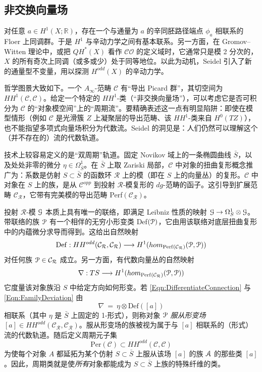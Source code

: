 \documentclass[11pt,a4paper]{article}
\numberwithin{equation}{section}
\newcommand{\bR}{\mathbb{R}}
\newcommand{\scrA}{\EuScript{A}}
\newcommand{\scrG}{\EuScript{G}}
\newcommand{\scrP}{\EuScript{P}}
\newcommand{\CC}{\mathcal{C}}
\begin{document}
\subsection{非交换向量场} 对任意 $a \in H^1(X;\bR)$，存在一个与通量为 $a$ 的辛同胚路径端点 $\phi_a$ 相联系的 Floer 上同调群。于是 $H^1$ 与辛动力学之间有基本联系。另一方面，在 Gromov--Witten 理论中，或把 $QH^*(X)$ 看作 $\mathcal{CO}$ 的定义域时，它通常只是模 2 分次的，$X$ 的所有奇次上同调（或多或少）处于同等地位。以此为动机，Seidel 引入了新的通量型不变量，用以探测 $H^{odd}(X)$ 的辛动力学。

哲学图景大致如下。一个 $A_{\infty}$-范畴 $\CC$ 有“导出 Picard 群”，其切空间为 $HH^1(\CC,\CC)$。给定一个特定的 $HH^1$-类（“非交换向量场”），可以考虑它是否可积分为 $\CC$ 的“对象模空间”上的“周期流”。要精确表述这一点有明显陷阱：即使在模型情形（例如 $\CC$ 是光滑簇 $Z$ 上凝聚层的导出范畴、该 $HH^1$-类来自 $H^0(TZ)$），也不能指望多项式向量场积分为代数流。Seidel 的洞见是：人们仍然可以理解这个（并不存在的）流的代数轨道。


技术上较容易定义的是“双周期”轨道。固定 Novikov 域上的一条椭圆曲线 $\bar{S}$，以及处处非零的微分 $\eta \in \Omega^1_{\bar{S}}$。在 $\bar{S}$ 上取 Zariski 局部，$\CC$ 中对象的扭曲复形概念推广为：系数是仿射 $S \subset \bar{S}$ 的函数环 $\mathcal{R}$ 上的模（即在 $S$ 上的向量丛）的复形。$\CC$ 中对象在 $S$ 上的族，是从 $\CC^{opp}$ 到投射 $\mathcal{R}$-模复形的 $dg$-范畴的函子。这引导到扩展范畴 $\CC_{\mathcal{R}}$，它带有完美模的导出范畴 Perf$(\CC_{\mathcal{R}})$。

投射 $\mathcal{R}$-模 $\scrG$ 本质上具有唯一的联络，即满足 Leibniz 性质的映射 $\scrG \rightarrow \Omega^1_{S} \otimes \scrG$。带联络的族 $\scrP$ 有一个相伴的无穷小形变类 Def$(\scrP)$，它由用该联络对底层扭曲复形中的内蕴微分求导而得到。这给出自然映射
\begin{equation} \label{Eqn:DifferentiateConnection}
\mathrm{Def}: HH^{odd}(\CC_{\mathcal{R}}, \CC_{\mathcal{R}}) \longrightarrow H^1(hom_{\mathrm{Perf}(\CC_{\mathcal{R}})}(\scrP, \scrP))
\end{equation}
对任何族 $\scrP \in \CC_{\mathcal{R}}$ 成立。另一方面，有代数向量丛的自然映射
\begin{equation} \label{Eqn:FamilyDeviation}
\nabla: TS \longrightarrow H^1(hom_{\mathrm{Perf}(\CC_{\mathcal{R}})}(\scrP, \scrP))
\end{equation}
它度量该对象族沿 $S$ 中给定方向如何形变。若 \eqref{Eqn:DifferentiateConnection} 与 \eqref{Eqn:FamilyDeviation} 由
\[
\nabla \ = \ \eta \otimes \mathrm{Def}([a])
\]
相联系（其中 $\eta$ 是 $\bar{S}$ 上固定的 1-形式），则称对象 $\scrP$ \emph{服从形变场} $[a] \in HH^{odd}(\CC_{\mathcal{R}}, \CC_{\mathcal{R}})$。服从形变场的族被视为属于与 $[a]$ 相联系的（形式）流的代数轨道。随后定义周期元子集
\[
\mathrm{Per}(\CC) \subset HH^{odd}(\CC,\CC)
\]
为使每个对象 $A$ 都延拓为某个仿射 $S\subset \bar{S}$ 上服从该场 $[a]$ 的族 $\scrA$ 的那些类 $[a]$。因此，周期类就是使\emph{所有}对象都能成为 $S\subset \bar{S}$ 上族的特殊纤维的类。
\end{document}
